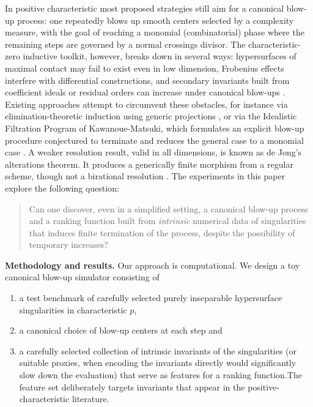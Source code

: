 \documentclass[11pt]{amsart}
\begin{document}
In positive characteristic most proposed strategies still aim for a canonical blow-up process: one repeatedly blows up smooth centers selected by a complexity measure, with the goal of reaching a monomial (combinatorial) phase where the remaining steps are governed by a normal crossings divisor. The characteristic-zero inductive toolkit, however, breaks down in several ways: hypersurfaces of maximal contact may fail to exist even in low dimension, Frobenius effects interfere with differential constructions, and secondary invariants built from coefficient ideals or residual orders can increase under canonical blow-ups \cite{Hauser2008,Hauser2010,HauserPerlega2018}. Existing approaches attempt to circumvent these obstacles, for instance via elimination-theoretic induction using generic projections \cite{Villamayor1989,Villamayor1995}, or via the Idealistic Filtration Program of Kawanoue-Matsuki, which formulates an explicit blow-up procedure conjectured to terminate and reduces the general case to a monomial case \cite{KawanoueMatsuki2006,KawanoueMatsuki2015}. A weaker resolution result, valid in all dimensions, is known as de Jong's alterations theorem. It produces a generically finite morphism from a regular scheme, though not a birational resolution \cite{deJong1996}. 
The experiments in this paper explore the following question:

\begin{quote}
Can one discover, even in a simplified setting, a canonical blow-up process and a ranking function built from \emph{intrinsic} numerical data of singularities that induces finite termination of the process, despite the possibility of temporary increases?
\end{quote}

\medskip
\noindent\textbf{Methodology and results.}
Our approach is computational. We design a toy canonical blow-up simulator consisting of 
\begin{enumerate}
    \item a test benchmark of carefully selected purely inseparable hypersurface singularities in characteristic $p$,
    \item  a canonical choice of blow-up centers at each step and
    \item a carefully selected collection of intrinsic invariants of the singularities (or suitable proxies, when encoding the invariants directly would significantly slow down the evaluation) that serve as features for a ranking function.The feature set deliberately targets invariants that appear in the positive-characteristic literature.
\end{enumerate}
\end{document}
